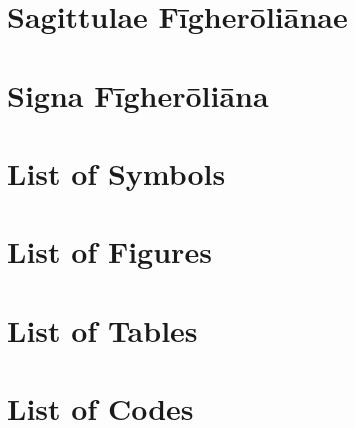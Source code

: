 \documentclass[12pt]{report}
\begin{document}
	
	
	
	
	
	\label{chap:symbola}
	
	\section{Sagittulae Fīgherōliānae}
	
	

	
	
	\section{Signa Fīgherōliāna}
	
	
	
	
	
	
	
	
	
	\section*{List of Symbols}
	
	\section*{List of Figures}
	
	
	\section*{List of Tables}
	
	
	\section*{List of Codes}
	
\end{document}
